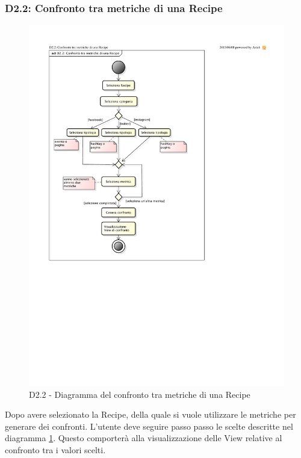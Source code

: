 		\subsubsection{D2.2: Confronto tra metriche di una Recipe} %
		\label{ssub:confronto_tra_metriche_di_una_recipe}
		\begin{figure}[!htbp]
			\centering
			\centerline{\includegraphics[scale=0.69]{./images/D2_2.pdf}}
			\caption{D2.2 - Diagramma del confronto tra metriche di una Recipe}
			\label{fig:d2_2}
		\end{figure}
		\noindent
		Dopo avere selezionato la Recipe, della quale si vuole utilizzare le metriche per generare dei confronti. L'utente deve seguire passo passo le scelte descritte nel diagramma \ref{fig:d2_2}. Questo comporterà alla visualizzazione delle View relative al confronto tra i valori scelti.


